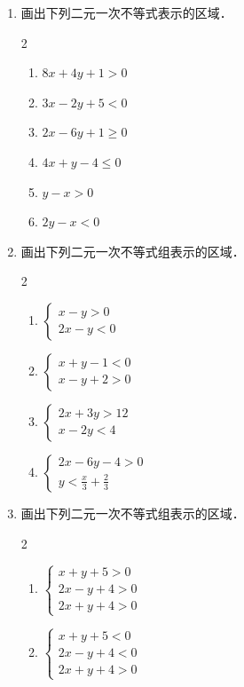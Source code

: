 \begin{ex}
\begin{enumerate}
    \item 画出下列二元一次不等式表示的区域．
\begin{multicols}{2}
\begin{enumerate}
    \item $8x+4y+1>0$
    \item $3x-2y+5<0$
    \item $2x-6y+1\ge 0$
    \item $4x+y-4\le 0$
    \item $y-x>0$
    \item $2y-x<0$
\end{enumerate}
\end{multicols}
\item 画出下列二元一次不等式组表示的区域．
\begin{multicols}{2}
\begin{enumerate}
\item $\begin{cases}
    x-y>0\\2x-y<0
\end{cases}$
\item $\begin{cases}
    x+y-1<0\\x-y+2>0
\end{cases}$
\item $\begin{cases}
    2x+3y>12\\ x-2y<4
\end{cases}$
\item $\begin{cases}
    2x-6y-4>0\\ y<\frac{x}{3}+\frac{2}{3}
\end{cases}$
\end{enumerate}
\end{multicols}
    \item 画出下列二元一次不等式组表示的区域．
\begin{multicols}{2}
\begin{enumerate}    
    \item $\begin{cases}
        x+y+5>0\\2x-y+4>0\\2x+y+4>0
    \end{cases}$
    \item $\begin{cases}
        x+y+5<0\\2x-y+4<0\\2x+y+4>0
    \end{cases}$
\end{enumerate}
\end{multicols}
\end{enumerate}
\end{ex}

